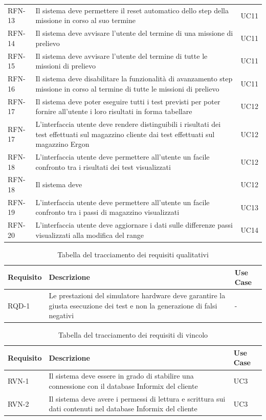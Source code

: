 \begin{table}
\begin{tabularx}{\textwidth}{lXl}
RFN-13    & Il sistema deve permettere il reset automatico dello step della missione in corso al suo termine & UC11 \\ 
RFN-14    & Il sistema deve avvisare l'utente del termine di una missione di prelievo & UC11 \\ 
RFN-15    & Il sistema deve avvisare l'utente del termine di tutte le missioni di prelievo & UC11 \\ 
RFN-16    & Il sistema deve disabilitare la funzionalità di avanzamento step missione in corso al termine di tutte le missioni di prelievo & UC11 \\ 
RFN-17    & Il sistema deve poter eseguire tutti i test previsti per poter fornire all'utente i loro risultati in forma tabellare  & UC12 \\ 
RFN-17    & L'interfaccia utente deve rendere distinguibili i risultati dei test effettuati sul magazzino cliente dai test effettuati sul magazzino Ergon  & UC12 \\ 
RFN-18    & L'interfaccia utente deve permettere all'utente un facile confronto tra i risultati dei test visualizzati  & UC12 \\ 
RFN-18    & Il sistema deve   & UC12 \\ 
RFN-19    & L'interfaccia utente deve permettere all'utente un facile confronto tra i passi di magazzino visualizzati & UC13 \\ 
RFN-20    & L'interfaccia utente deve aggiornare i dati sulle differenze passi visualizzati alla modifica del range & UC14 \\ 

\hline
\end{tabularx}
\end{table}

\begin{table}
\caption{Tabella del tracciamento dei requisiti qualitativi}
\label{tab:requisiti-qualitativi}
\begin{tabularx}{\textwidth}{lXl}
\hline\hline
\textbf{Requisito} & \textbf{Descrizione} & \textbf{Use Case}\\
\hline
RQD-1    & Le prestazioni del simulatore hardware deve garantire la giusta esecuzione dei test e non la generazione di falsi negativi & - \\
\hline
\end{tabularx}
\end{table}

\begin{table}
    \caption{Tabella del tracciamento dei requisiti di vincolo}
\label{tab:requisiti-vincolo}
\begin{tabularx}{\textwidth}{lXl}
\hline\hline
\textbf{Requisito} & \textbf{Descrizione} & \textbf{Use Case}\\
\hline
RVN-1     & Il sistema deve essere in grado di stabilire una connessione con il database Informix del cliente & UC3 \\ 
RVN-2     & Il sistema deve avere i permessi di lettura e scrittura sui dati contenuti nel database Informix del cliente & UC3 \\ 

\hline
\end{tabularx}
\end{table}
